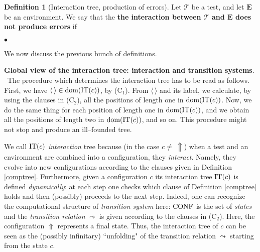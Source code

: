 \documentclass[copyright,creativecommons]{eptcs}
\newcommand{\vv}{\langle}
\newcommand{\ww}{\rangle}
\newcommand{\roo}{\vv \, \ww}
\newcommand{\cT}{\mathcal{T}}
\newcommand{\bE}{\mathbf{E}}
\newcommand{\dom}{\ensuremath{\textnormal{dom}}}
\newcommand{\conf}{\textnormal{CONF}}
\newcommand{\CT}{\textnormal{IT}}
\theoremstyle{definition}
\newtheorem{Definition}[theorem]{Definition}
\newcommand{\squishlist}{
 \begin{list}{$\bullet$}
  { \setlength{\itemsep}{0pt}
     \setlength{\parsep}{3pt}
     \setlength{\topsep}{3pt}
     \setlength{\partopsep}{0pt}
     \setlength{\leftmargin}{1em}
     \setlength{\labelwidth}{1.5em}
     \setlength{\labelsep}{0.5em} } }
\newcommand{\squishend}{
  \end{list}  }
\begin{document}
\begin{Definition}[Interaction tree, production of errors]
Let $\cT$ be a test,  and let $\bE$ be an environment.
We say that the \textbf{the interaction between $\cT$ and $\bE$ does not produce errors}
if
\squishlist
\item[] \centering{there is \emph{no} $p \in \dom(\CT(\big(\cT,\bE\big)))$
such that \,\! $\CT(\big(\cT,\bE\big))(p) = \ \Uparrow$ \enspace.

\vspace{-0.57cm}
\hfill$\triangle$ \par}
\squishend
\end{Definition}



We now discuss the previous bunch of definitions.\\

\vspace{-0.35cm}

\noindent \textbf{Global view of the interaction tree: interaction and transition systems}. \
The procedure which determines the interaction tree has to be read as follows. First, we have
 $\roo \in \dom(\CT(c))$, by (C$_1$).
From $\roo$ and its label,
we calculate, by using the clauses in (C$_2$), all the positions
of length one in  $\dom(\CT(c))$. Now,
we do the same thing for
each position
of length one
 in $\dom(\CT(c))$, and we  obtain
 all the positions
of length two in $\dom(\CT(c))$, and so on. This procedure might  not stop
and produce an ill--founded tree.



We call  $\CT(c)$   \emph{interaction} tree
because (in the case $c \neq \ \Uparrow$)
when a test and an environment are combined into a configuration, they \emph{interact}. Namely, they evolve into  new configurations according to
the clauses given in Definition \ref{comptree}.
 Furthermore, given a configuration $c$ its interaction tree $\CT(c)$ is defined
\emph{dynamically}: at each step one checks which clause
of Definition \ref{comptree} holds and then (possibly) proceeds to the
next step.  Indeed, one
can recognize the computational structure of \emph{transition system}  here: $ \conf$
is the set of   \emph{states} and
the \emph{transition relation} $\leadsto$ is
given according to the clauses
in (C$_2$).
Here,   the configuration  $\Uparrow$ represents a final state.
Thus, the interaction tree of $c$ can be seen
 as the (possibly
infinitary) ``unfolding" of the  transition relation $\leadsto$ starting from the state  $c$.\\

\vspace{-0.35cm}
\end{document}
